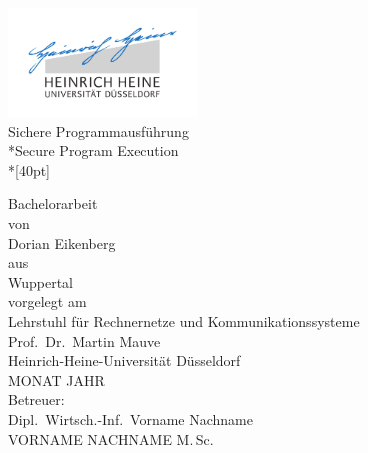
\begin{titlepage}
  \centering
  \includegraphics[width=5cm]{fig/unilogo}\\

  \vfill
  \huge
  Sichere Programmausführung\\*Secure Program Execution\\*[40pt]
  \normalsize

  \vfill
  \large
  Bachelorarbeit\\[0.25em]
  \normalsize
  von\\
  \Large
  Dorian Eikenberg\\

  \vspace{5mm}
  \normalsize
  aus\\ Wuppertal\\[1cm]
  vorgelegt am\\[5mm]
  Lehrstuhl für Rechnernetze und Kommunikationssysteme\\
  Prof.\ Dr.\ Martin Mauve\\ 
  Heinrich-Heine-Universität Düsseldorf\\[0.5cm]
  MONAT JAHR\\[0.5cm]
  Betreuer:\\
  Dipl.\ Wirtsch.-Inf.\ Vorname Nachname\\
  VORNAME NACHNAME M.\,Sc.
    
\end{titlepage}


